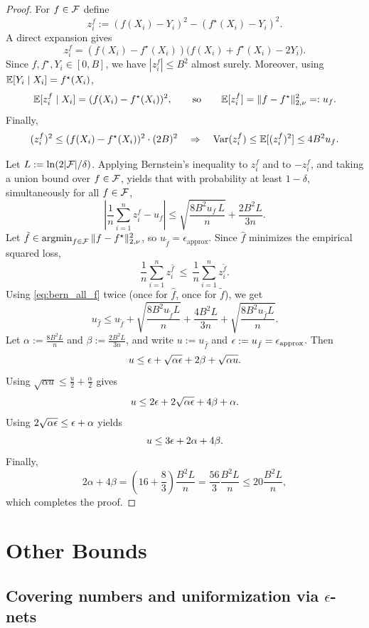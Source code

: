 \begin{proof}
For $f\in\mathcal{F}$ define
\[
z_i^f := (f(X_i)-Y_i)^2 - (f^\star(X_i)-Y_i)^2.
\]
A direct expansion gives
\[
z_i^f = (f(X_i)-f^\star(X_i))\big(f(X_i)+f^\star(X_i)-2Y_i\big).
\]
Since $f,f^\star,Y_i\in[0,B]$, we have $|z_i^f|\le B^2$ almost surely. Moreover,
using $\mathbb{E}[Y_i\mid X_i]=f^\star(X_i)$,
\[
\mathbb{E}[z_i^f\mid X_i] = (f(X_i)-f^\star(X_i))^2,
\qquad\text{so}\qquad
\mathbb{E}[z_i^f] = \|f-f^\star\|_{2,\nu}^2 =: u_f.
\]
Finally,
\[
(z_i^f)^2 \le (f(X_i)-f^\star(X_i))^2\cdot (2B)^2
\quad\Rightarrow\quad
\operatorname{Var}(z_i^f)\le \mathbb{E}[(z_i^f)^2]\le 4B^2 u_f.
\]

Let $L:=\ln(2|\mathcal{F}|/\delta)$. Applying Bernstein’s inequality to $z_i^f$ and to
$-z_i^f$, and taking a union bound over $f\in\mathcal{F}$, yields that with probability
at least $1-\delta$, simultaneously for all $f\in\mathcal{F}$,
\begin{equation}\label{eq:bern_all_f}
\left|\frac{1}{n}\sum_{i=1}^n z_i^f - u_f\right|
\le
\sqrt{\frac{8B^2 u_f\,L}{n}}
+
\frac{2B^2 L}{3n}.
\end{equation}
Let $\tilde f\in\operatorname*{argmin}_{f\in\mathcal{F}}\|f-f^\star\|_{2,\nu}^2$, so $u_{\tilde f}=\epsilon_{\mathrm{approx}}$.
Since $\hat f$ minimizes the empirical squared loss,
\[
\frac{1}{n}\sum_{i=1}^n z_i^{\hat f}\ \le\ \frac{1}{n}\sum_{i=1}^n z_i^{\tilde f}.
\]
Using \eqref{eq:bern_all_f} twice (once for $\hat f$, once for $\tilde f$), we get
\[
u_{\hat f}
\le
u_{\tilde f}
+
\sqrt{\frac{8B^2 u_{\tilde f}L}{n}}
+\frac{4B^2 L}{3n}
+
\sqrt{\frac{8B^2 u_{\hat f}L}{n}}.
\]
Let $\alpha:=\frac{8B^2 L}{n}$ and $\beta:=\frac{2B^2 L}{3n}$, and write $u:=u_{\hat f}$ and
$\epsilon:=u_{\tilde f}=\epsilon_{\mathrm{approx}}$. Then
\[
u \le \epsilon + \sqrt{\alpha\epsilon} + 2\beta + \sqrt{\alpha u}.
\]
Using $\sqrt{\alpha u}\le \frac{u}{2}+\frac{\alpha}{2}$ gives
\[
u \le 2\epsilon + 2\sqrt{\alpha\epsilon} + 4\beta + \alpha.
\]
Using $2\sqrt{\alpha\epsilon}\le \epsilon+\alpha$ yields
\[
u \le 3\epsilon + 2\alpha + 4\beta.
\]
Finally,
\[
2\alpha+4\beta
=
\left(16+\frac{8}{3}\right)\frac{B^2 L}{n}
=
\frac{56}{3}\frac{B^2 L}{n}
\le
20\frac{B^2 L}{n},
\]
which completes the proof.
\end{proof}



\section{Other Bounds}

\subsection{Covering numbers and uniformization via $\epsilon$-nets}
\label{app:covering_uniformization}

